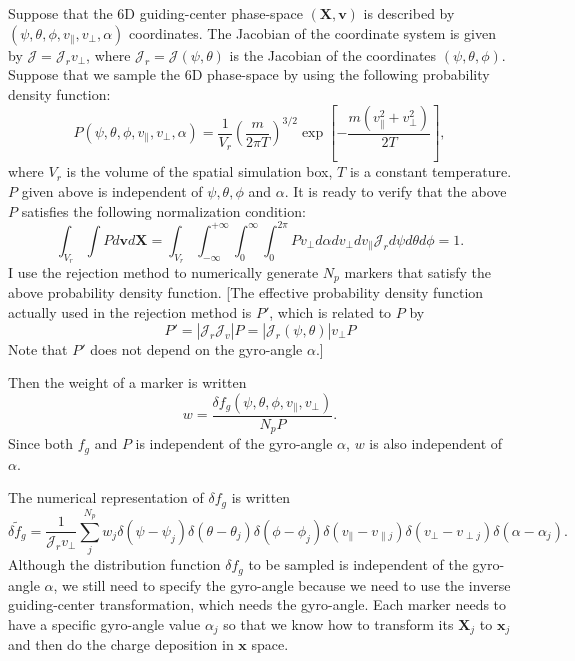 \documentclass{article}
\begin{document}
Suppose that the 6D guiding-center phase-space $(\mathbf{X}, \mathbf{v})$ is
described by $(\psi, \theta, \phi, v_{\parallel}, v_{\perp}, \alpha)$
coordinates. The Jacobian of the coordinate system is given by $\mathcal{J} =
\mathcal{J}_r v_{\perp} \mathcal{}$, where $\mathcal{J}_r = \mathcal{J} (\psi,
\theta)$ is the Jacobian of the coordinates $(\psi, \theta, \phi)$. Suppose
that we sample the 6D phase-space by using the following probability density
function:
\begin{equation}
  \label{19-1-26-1} P (\psi, \theta, \phi, v_{\parallel}, v_{\perp}, \alpha) =
  \frac{1}{V_r} \left( \frac{m}{2 \pi T} \right)^{3 / 2} \exp \left[ - \frac{m
  (v_{\parallel}^2 + v_{\perp}^2)}{2 T} \right],
\end{equation}
where $V_r$ is the volume of the spatial simulation box, $T$ is a constant
temperature. $P$ given above is independent of $\psi, \theta, \phi$ and
$\alpha$. It is ready to verify that the above $P$ satisfies the following
normalization condition:
\begin{equation}
  \int_{V_r} \int P d\mathbf{v}d\mathbf{X}= \int_{V_r} \int_{- \infty}^{+
  \infty} \int_0^{\infty} \int_0^{2 \pi} P v_{\perp} d \alpha d v_{\perp} d
  v_{\parallel} \mathcal{J}_r d \psi d \theta d \phi = 1.
\end{equation}
I use the rejection method to numerically generate $N_p$ markers that satisfy
the above probability density function. [The effective probability density
function actually used in the rejection method is $P'$, which is related to
$P$ by
\begin{equation}
  P' = | \mathcal{J}_r \mathcal{J}_v | P = | \mathcal{J}_r (\psi, \theta) |
  v_{\perp} P
\end{equation}
Note that $P'$ does not depend on the gyro-angle $\alpha$.]

Then the weight of a marker is written
\begin{equation}
  w = \frac{\delta f_g (\psi, \theta, \phi, v_{\parallel}, v_{\perp})}{N_p P}
  .
\end{equation}
Since both $f_g$ and $P$ is independent of the gyro-angle $\alpha$, $w$ is
also independent of $\alpha$.

The numerical representation of $\delta f_g$ is written
\begin{equation}
  \delta \tilde{f}_g = \frac{1}{\mathcal{J}_r v_{\perp}} \sum_j^{N_p} w_j
  \delta (\psi - \psi_j) \delta (\theta - \theta_j) \delta (\phi - \phi_j)
  \delta (v_{\parallel} - v_{\parallel j}) \delta (v_{\perp} - v_{\perp j})
  \delta (\alpha - \alpha_j) .
\end{equation}
Although the distribution function $\delta f_g$ to be sampled is independent
of the gyro-angle $\alpha$, we still need to specify the gyro-angle because we
need to use the inverse guiding-center transformation, which needs the
gyro-angle. Each marker needs to have a specific gyro-angle value $\alpha_j$
so that we know how to transform its $\mathbf{X}_j$ to $\mathbf{x}_j$ and then
do the charge deposition in $\mathbf{x}$ space.
\end{document}
